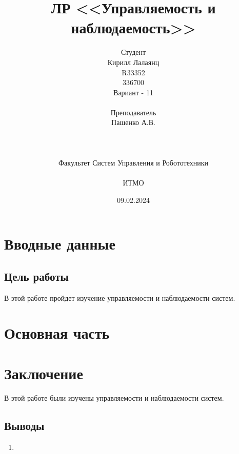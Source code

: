 \documentclass[16pt]{article}
\title{ЛР \textnumero 7 <<Управляемость и наблюдаемость>>}
\author{
Студент \\
Кирилл Лалаянц\\
R33352\\
336700\\
Вариант - 11\\
\\
Преподаватель\\
Пашенко А.В. \\
\\
\\
\\
Факультет Систем Управления и Робототехники\\
\\
ИТМО\\
}
\date{09.02.2024}
\begin{document}
\maketitle
\newpage
\tableofcontents
\thispagestyle{empty}

\newpage
\setcounter{page}{1}
\section{Вводные данные}
\subsection{Цель работы}
В этой работе пройдет изучение управляемости и наблюдаемости систем.

\newpage
\section{Основная часть}


\newpage
\section{Заключение}
В этой работе были изучены управляемости и наблюдаемости систем.
\subsection{Выводы}
\begin{enumerate}
   \item 
\end{enumerate}
\end{document}
